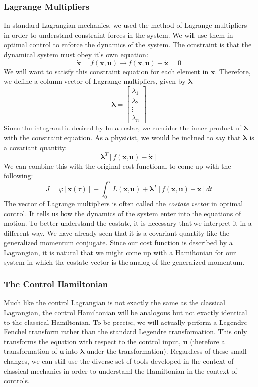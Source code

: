 \subsubsection{Lagrange Multipliers}
In standard \gls{Lagrangian} mechanics, we used the method of Lagrange multipliers in order to understand constraint forces in the system. We will use them in optimal control to enforce the dynamics of the system. The constraint is that the dynamical system must obey it's own equation:
$$\bm{\dot{x}}=f(\bm{x},\bm{u})\rightarrow f(\bm{x},\bm{u})-\bm{\dot{x}}=0$$
We will want to satisfy this constraint equation for each element in $\bm{x}$. Therefore, we define a column vector of Lagrange multipliers, given by $\bm{\lambda}$:
$$\bm{\lambda}=\begin{bmatrix}
    \lambda_1\\\lambda_2\\\vdots\\\lambda_n
\end{bmatrix}$$
Since the integrand is desired by be a scalar, we consider the inner product of $\bm{\lambda}$ with the constraint equation. As a physicist, we would be inclined to say that $\bm{\lambda}$ is a covariant quantity:
$$\bm{\lambda}^T[f(\bm{x},\bm{u})-\bm{\dot{x}}]$$
We can combine this with the original cost functional to come up with the following:
$$J=\varphi[\bm{x}(\tau)]+\int_0^\tau L(\bm{x},\bm{u})+\bm{\lambda}^T[f(\bm{x},\bm{u})-\bm{\dot{x}}]dt$$
The vector of Lagrange multipliers is often called the \textit{costate vector} in optimal control. It tells us how the dynamics of the system enter into the equations of motion.  To better understand the costate, it is necessary that we interpret it in a different way. We have already seen that it is a covariant quantity like the generalized momentum conjugate. Since our cost function is described by a \gls{Lagrangian}, it is natural that we might come up with a \gls{Hamiltonian} for our system in which the costate vector is the analog of the generalized momentum.

\subsubsection{The Control Hamiltonian}
Much like the control \gls{Lagrangian} is not exactly the same as the classical \gls{Lagrangian}, the control \gls{Hamiltonian} will be analogous but not exactly identical to the classical \gls{Hamiltonian}. To be precise, we will actually perform a Legendre-Fenchel transform rather than the standard Legendre transformation. This only transforms the equation with respect to the control input, $\bm{u}$ (therefore a transformation of $\bm{u}$ into $\bm{\lambda}$ under the transformation). Regardless of these small changes, we can still use the diverse set of tools developed in the context of classical mechanics in order to understand the \gls{Hamiltonian} in the context of controls.

